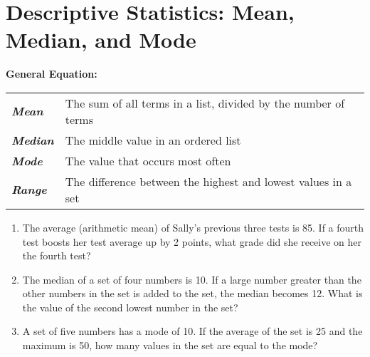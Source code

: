 \section{Descriptive Statistics: Mean, Median, and Mode}

\textbf{General Equation:}

\begin{center}
\renewcommand{\arraystretch}{1.5}
\begin{tabular}{>{\itshape\bfseries}ll}
Mean & The sum of all terms in a list, divided by the number of terms\\
Median & The middle value in an ordered list\\
Mode & The value that occurs most often\\
Range & The difference between the highest and lowest values in a set
\end{tabular}
\end{center}

\begin{enumerate}[labelindent=*,style=multiline,leftmargin=*,label=\textbf{Example \arabic*:}]
\item The average (arithmetic mean) of Sally's previous three tests is 85. If a fourth test boosts her test average up by 2 points, what grade did she receive on her the fourth test?
\vfill\item The median of a set of four numbers is 10. If a large number greater than the other numbers in the set is added to the set, the median becomes 12. What is the value of the second lowest number in the set?
\vfill\item A set of five numbers has a mode of 10. If the average of the set is 25 and the maximum is 50, how many values in the set are equal to the mode?
\end{enumerate}

